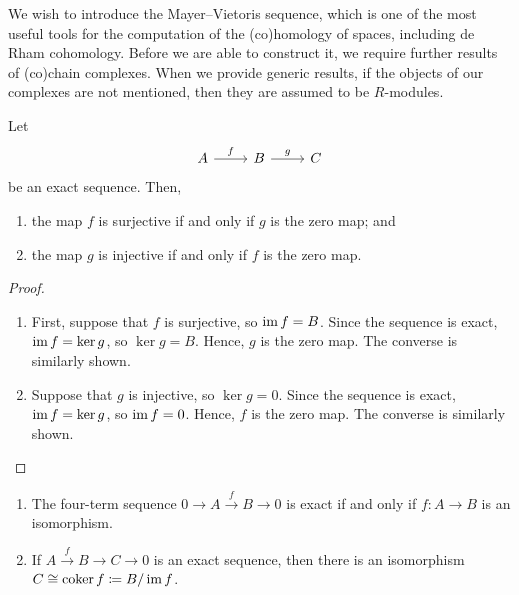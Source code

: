 \documentclass[a4paper,12pt]{article}
\begin{document}
We wish to introduce the Mayer--Vietoris sequence, which is one of the most useful tools for the computation of the (co)homology of spaces, including de Rham cohomology.
Before we are able to construct it, we require further results of (co)chain complexes.
When we provide generic results, if the objects of our complexes are not mentioned, then they are assumed to be $R$-modules.
\begin{proposition}\label{prop:three-term_exact_sequence}
    Let
    \[\begin{tikzcd}
	A & B & C
	\arrow["f", from=1-1, to=1-2]
	\arrow["g", from=1-2, to=1-3]
    \end{tikzcd}\]
    be an exact sequence.
    Then,
    \begin{enumerate}
        \item the map $f$ is surjective if and only if $g$ is the zero map; and
        \item the map $g$ is injective if and only if $f$ is the zero map.
    \end{enumerate}
\end{proposition}
\begin{proof} \leavevmode
    \begin{enumerate}
        \item First, suppose that $f$ is surjective, so $\operatorname{im} f = B$.
              Since the sequence is exact, $\operatorname{im} f = \ker g$, so $\ker g = B$.
              Hence, $g$ is the zero map.
              The converse is similarly shown.
        \item Suppose that $g$ is injective, so $\ker g = 0$.
              Since the sequence is exact, $\operatorname{im} f = \ker g$, so $\operatorname{im} f = 0$.
              Hence, $f$ is the zero map.
              The converse is similarly shown. \qedhere
    \end{enumerate}
\end{proof}
\begin{proposition}\label{prop:four-term_exact_sequence} \leavevmode
    \begin{enumerate}
        \item The four-term sequence $0 \to A \xrightarrow{f} B \to 0$ is exact if and only if $f \colon A \to B$ is an isomorphism.
        \item If $A \xrightarrow{f} B \to C \to 0$ is an exact sequence, then there is an isomorphism $C \cong \operatorname{coker} f \coloneq B / \operatorname{im} f$.
    \end{enumerate}
\end{proposition}
\end{document}
